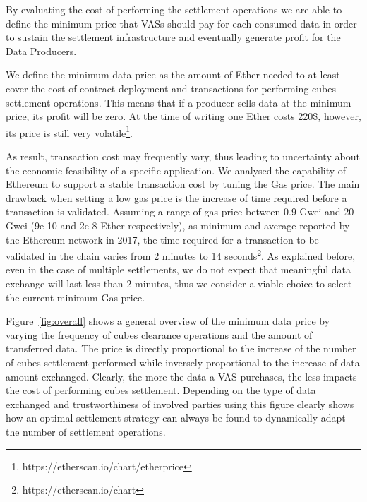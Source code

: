 By evaluating the cost of performing the settlement operations we are able to define the minimum price that VASs should pay for each consumed data in order to sustain the settlement infrastructure and eventually generate profit for the Data Producers.

We define the minimum data price as the amount of Ether needed to at least cover the cost of contract deployment and transactions for performing cubes settlement operations. This means that if a producer sells data at the minimum price, its profit will be zero. 
At the time of writing one Ether costs 220\$, however, its price is still very volatile\footnote{https://etherscan.io/chart/etherprice}.

As result, transaction cost may frequently vary, thus leading to uncertainty about the economic feasibility of a specific application. We analysed the capability of Ethereum to support a stable transaction cost by tuning the Gas price. The main drawback when setting a low gas price is the increase of time required before a transaction is validated. Assuming a range of gas price between 0.9 Gwei and 20 Gwei (9e-10 and 2e-8 Ether respectively), as minimum and average reported by the Ethereum network in 2017, the time required for a transaction to be validated in the chain varies from 2 minutes to 14 seconds\footnote{https://etherscan.io/chart}. As explained before, even in the case of multiple settlements, we do not expect that meaningful data exchange will last less than 2 minutes, thus we consider a viable choice to select the current minimum Gas price.


Figure~\ref{fig:overall} shows a general overview of the minimum data price by varying the frequency of cubes clearance operations and the amount of transferred data. The price is directly proportional to the increase of the number of cubes settlement performed while inversely proportional to the increase of data amount exchanged. Clearly, the more the data a VAS purchases, the less impacts the cost of performing cubes settlement. Depending on the type of data exchanged and trustworthiness of involved parties using this figure clearly shows how an optimal settlement strategy can always be found to dynamically adapt the number of settlement operations.

